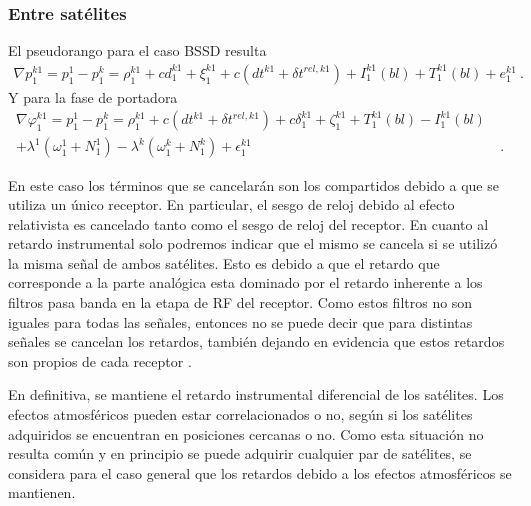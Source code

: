 \documentclass[a4paper,12pt,oneside,onecolumn,final,openright]{book}%
\begin{document}
\subsubsection{Entre satélites}
	El pseudorango para el caso BSSD resulta
\begin{align}\label{BSSD_pr}
	\nabla p_1^{k1} = p_1^1 - p_1^k = \rho_1^{k1} + cd_1^{k1} + \xi_1^{k1} + c\left( dt^{k1} + \delta t^{rel,k1} \right) + I_1^{k1}(bl) + T_1^{k1}(bl) + e_1^{k1} \ .
\end{align}
	Y para la fase de portadora 
\begin{align}\label{BSSD_fdp}
	\nabla \varphi_1^{k1} = p_1^1 - p_1^k = \rho_1^{k1} + c\left( dt^{k1} + \delta t^{rel,k1} \right) + c\delta_1^{k1} + \zeta_1^{k1} + T_1^{k1}(bl) - I_1^{k1}(bl) &\\
	+ \lambda^1\left( \omega_1^1 + N_1^1 \right) - \lambda^k\left( \omega_1^k + N_1^k \right) + \epsilon_1^{k1}& \ . \nonumber
\end{align}

	En este caso los términos que se cancelarán son los compartidos debido a que se utiliza un único receptor. En particular, el sesgo de reloj debido al efecto relativista es cancelado tanto como el sesgo de reloj del receptor. En cuanto al retardo instrumental solo podremos indicar que el mismo se cancela si se utilizó la misma señal de ambos satélites. Esto es debido a que el retardo que corresponde a la parte analógica esta dominado por el retardo inherente a los filtros pasa banda en la etapa de RF del receptor. Como estos filtros no son iguales para todas las señales, entonces no se puede decir que para distintas señales se cancelan los retardos, también dejando en evidencia que estos retardos son propios de cada receptor \cite{psiakis}.
	
	En definitiva, se mantiene el retardo instrumental diferencial de los satélites. Los efectos atmosféricos pueden estar correlacionados o no, según si los satélites adquiridos se encuentran en posiciones cercanas o no. Como esta situación no resulta común y en principio se puede adquirir cualquier par de satélites, se considera para el caso general que los retardos debido a los efectos atmosféricos se mantienen.
\end{document}
